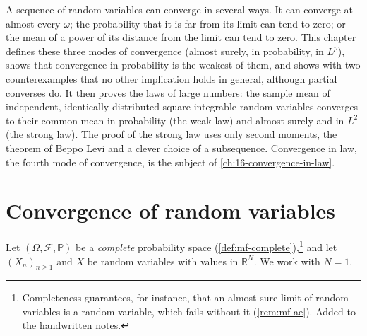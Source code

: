 
A sequence of random variables can converge in several ways. It can converge at almost every
$\omega$; the probability that it is far from its limit can tend to zero; or the mean of a
power of its distance from the limit can tend to zero. This chapter defines these three modes
of convergence (almost surely, in probability, in $L^p$), shows that convergence in probability
is the weakest of them, and shows with two counterexamples that no other implication holds in
general, although partial converses do. It then proves the laws of large numbers: the sample
mean of independent, identically distributed square-integrable random variables converges to
their common mean in probability (the weak law) and almost surely and in $L^2$ (the strong
law). The proof of the strong law uses only second moments, the theorem of Beppo Levi and a
clever choice of a subsequence. Convergence in law, the fourth mode of convergence, is the
subject of \cref{ch:16-convergence-in-law}.

\section{Convergence of random variables}\label{sec:ll-convergence}

Let $(\Omega,\mathcal F,\mathbb P)$ be a \emph{complete} probability space
(\cref{def:mf-complete}),\footnote{Completeness guarantees, for instance, that an almost sure
limit of random variables is a random variable, which fails without it
(\cref{rem:mf-ae}). Added to the handwritten notes.} and let $(X_n)_{n\ge1}$ and $X$ be random
variables with values in $\mathbb R^N$. We work with $N=1$.

